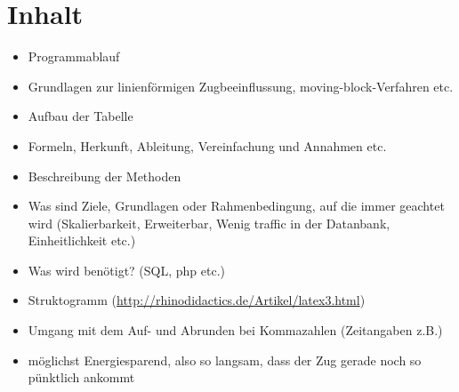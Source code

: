 \section{Inhalt}


\begin{itemize}
\item Programmablauf
\item Grundlagen zur linienförmigen Zugbeeinflussung, moving-block-Verfahren etc.
\item Aufbau der Tabelle
\item Formeln, Herkunft, Ableitung, Vereinfachung und Annahmen etc.
\item Beschreibung der Methoden
\item Was sind Ziele, Grundlagen oder Rahmenbedingung, auf die immer geachtet wird (Skalierbarkeit, Erweiterbar, Wenig \glqq traffic\grqq{} in der Datanbank, Einheitlichkeit etc.)
\item Was wird benötigt? (SQL, php etc.)
\item Struktogramm (\url {http://rhinodidactics.de/Artikel/latex3.html})
\item Umgang mit dem Auf- und Abrunden bei Kommazahlen (Zeitangaben z.B.)
\item möglichst Energiesparend, also so langsam, dass der Zug gerade noch so pünktlich ankommt
\end{itemize}